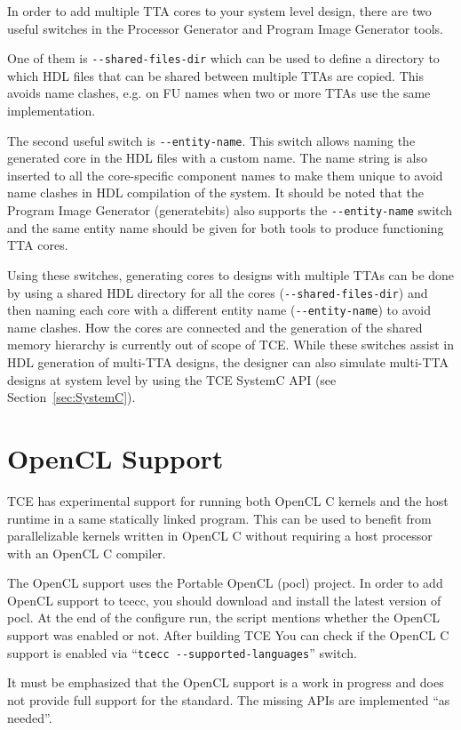 \documentclass[twoside]{tceusermanual}
\begin{document}
In order to add multiple TTA cores to your system level design, there are
two useful switches in the Processor Generator and Program Image Generator 
tools. 

One of them is \verb|--shared-files-dir| which can be used to define 
a directory to which HDL files that can be shared between multiple TTAs are 
copied. This avoids name clashes, e.g. on FU names when two or more TTAs 
use the same implementation. 

The second useful switch is \verb|--entity-name|. This switch allows
naming the generated core in the HDL files with a custom name. The name 
string is also inserted to all the core-specific component names to make
them unique to avoid name clashes in HDL compilation of the system. It
should be noted that the Program Image Generator (generatebits) also
supports the \verb|--entity-name| switch and the same entity name should
be given for both tools to produce functioning TTA cores.

Using these switches, generating cores to designs with multiple TTAs can
be done by using a shared HDL directory for all the cores (\verb|--shared-files-dir|) 
and then naming each core with a different entity name (\verb|--entity-name|) to 
avoid name clashes. How the cores are connected and the generation of
the shared memory hierarchy is currently out of scope of TCE. While
these switches assist in HDL generation of multi-TTA designs, the
designer can also simulate multi-TTA designs at system level by
using the TCE SystemC API (see Section~\ref{sec:SystemC}).

\section{OpenCL Support}

TCE has experimental support for running both OpenCL C kernels and the host 
runtime in a same statically linked program. This can be used to benefit from
parallelizable kernels written in OpenCL C without requiring a host processor 
with an OpenCL C compiler.

The OpenCL support uses the {Portable OpenCL (pocl)} project. In order to
add OpenCL support to tcecc, you should download and install the latest version of 
pocl. At the end of the configure run, the script 
mentions whether the OpenCL support was enabled or not. After building TCE
You can check if the OpenCL C support is enabled via ``\verb|tcecc --supported-languages|''
switch.

It must be emphasized that the OpenCL support is a work in progress and
does not provide full support for the standard. The missing APIs are
implemented ``as needed''.
\end{document}
